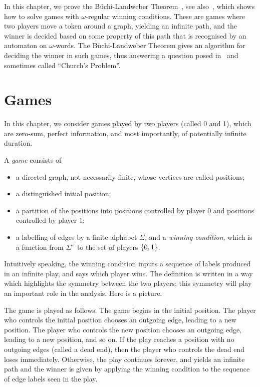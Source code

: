 In this chapter, we prove the Büchi-Landweber Theorem~\cite[Theorem 1]{Buchi:1969iq}, see also~\cite[Theorem 6.5]{Thomas:1997ec}, which shows how to solve games with $\omega$-regular winning conditions. These are games where two players move a token around a graph, yielding an infinite path, and the winner is decided based on some property of this path that is recognised by an automaton on $\omega$-words. 
The Büchi-Landweber Theorem gives an algorithm for deciding the winner in such games, thus answering a question posed in~\cite{Church:1962wp} and sometimes called  ``Church's Problem''.

\section{Games}
In this chapter, we consider games played by two players (called 0 and 1), which are zero-sum, perfect information, and most importantly, of potentially infinite duration. 


\begin{definition}[Game]
A \emph{game} consists of 
\begin{itemize}
	\item a directed graph, not necessarily finite, whose vertices are called positions;
\item  a distinguished initial position;
\item a partition of the positions into positions controlled by player 0  and positions controlled by player 1;
\item a labelling of edges by a finite alphabet $\Sigma$, and a \emph{winning condition}, which is a function from $\Sigma^\omega$ to the set of players $\{0,1\}$.
\end{itemize}	
\end{definition}
Intuitively speaking, the winning condition inputs a sequence of labels produced in an infinite play, and says which player wins. The definition is written in a way which highlights the symmetry between the two players; this symmetry will play an important role in the analysis.
Here is a picture.


The game is played as follows. The game begins in the initial position. The player who controls the initial position chooses an outgoing edge, leading to a new position. The player who controls the new position chooses an outgoing edge, leading to a new position, and so on. If the play reaches a position with no outgoing edges (called a dead end), then the player who controls the dead end loses immediately. Otherwise, the play continues forever, and yields an infinite path and the winner is given by applying the  winning condition to the sequence of edge labels seen in the play.


